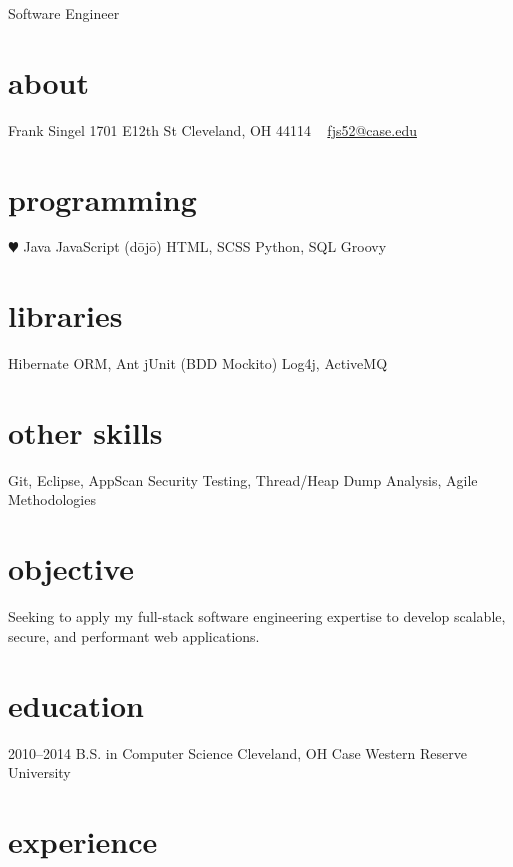 \documentclass[]{friggeri-cv}
\begin{document}
       {Software Engineer}


\begin{aside}
  \section{about}
    Frank Singel
    1701 E12th St
    Cleveland, OH
    44114
    ~
    \href{mailto:fjs52@case.edu}{fjs52@case.edu}
  \section{programming}
    {\color{red} $\varheartsuit$} Java
    JavaScript
    (d\={o}j\={o})
    HTML, SCSS
    Python, SQL
    Groovy
  \section{libraries}
    Hibernate ORM, Ant
    jUnit (BDD Mockito)
    Log4j, ActiveMQ
  \section{other skills}
    Git, Eclipse,
    AppScan Security Testing,
    Thread/Heap Dump Analysis,
    Agile Methodologies
    
\end{aside}

\section{objective}
Seeking to apply my full-stack software engineering expertise to develop scalable, secure, and performant web applications.

\section{education}

\begin{entrylist}
  \entry
    {2010–2014}
    {B.S. in Computer Science}
    {Cleveland, OH}
    {Case Western Reserve University}
\end{entrylist}

\section{experience}
\end{document}
